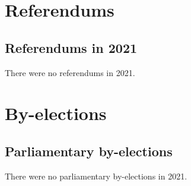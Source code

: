 \documentclass[a4paper,openany]{book}
\begin{document}



\part{Referendums}

\chapter{Referendums in 2021}

There were no referendums in 2021.

%
%

\part{By-elections}

\chapter{Parliamentary by-elections}

There were no parliamentary by-elections in 2021.
\end{document}
